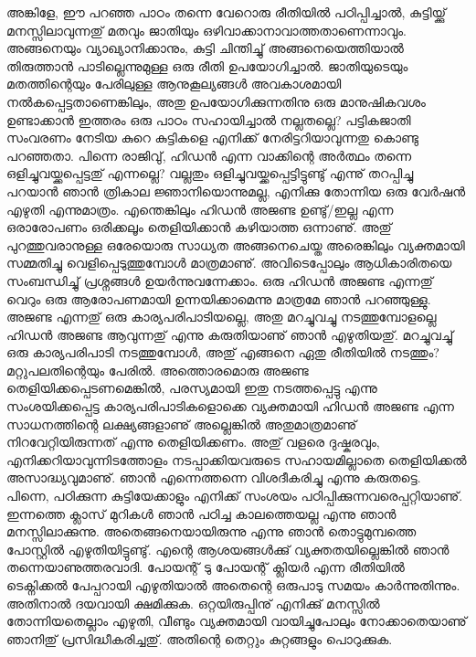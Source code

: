 \begin{enumerate}
അങ്കിളേ, ഈ പറഞ്ഞ പാഠം തന്നെ വേറൊരു രീതിയില്‍ പഠിപ്പിച്ചാല്‍, കുട്ടിയ്ക്കു് മനസ്സിലാവുന്നതു് മതവും ജാതിയും 
ഒഴിവാക്കാനാവാത്തതാണെന്നാവും. അങ്ങനെയും വ്യാഖ്യാനിക്കാനും, കുട്ടി ചിന്തിച്ചു് അങ്ങനെയെത്തിയാല്‍ തിരുത്താന്‍ 
പാടില്ലെന്നുമുള്ള ഒരു രീതി ഉപയോഗിച്ചാല്‍. ജാതിയുടെയും മതത്തിന്റെയും പേരിലുള്ള ആനുകൂല്യങ്ങള്‍ 
അവകാശമായി നല്‍കപ്പെട്ടതാണെങ്കിലും, അതു ഉപയോഗിക്കുന്നതിനു ഒരു മാനുഷികവശം ഉണ്ടാക്കാന്‍ ഇത്തരം 
ഒരു പാഠം സഹായിച്ചാല്‍ നല്ലതല്ലെ? പട്ടികജാതി സംവരണം നേടിയ കുറെ കുട്ടികളെ എനിക്ക് നേരിട്ടറിയാവുന്നതു കൊണ്ടു 
പറഞ്ഞതാ. പിന്നെ രാജിവു്, ഹിഡന്‍ എന്ന വാക്കിന്റെ അര്‍ത്ഥം തന്നെ ഒളിച്ചുവയ്ക്കപ്പെട്ടതു് എന്നല്ലെ? 
വല്ലതും ഒളിച്ചുവയ്ക്കപ്പെട്ടിട്ടുണ്ടു് എന്നു് തറപ്പിച്ചു പറയാന്‍ ഞാന്‍ ത്രികാല ജ്ഞാനിയൊന്നുമല്ല, എനിക്കു തോന്നിയ ഒരു വേര്‍ഷന്‍ 
എഴുതി എന്നുമാത്രം. എന്തെങ്കിലും ഹിഡന്‍ അജണ്ട ഉണ്ടു്/ഇല്ല എന്ന ഒരാരോപണം ഒരിക്കലൂം തെളിയിക്കാന്‍ 
കഴിയാത്ത ഒന്നാണു്. അതു് പുറത്തുവരാനുള്ള ഒരേയൊരു സാധ്യത അങ്ങനെചെയ്ത അരെങ്കിലും വ്യക്തമായി 
സമ്മതിച്ചു വെളിപ്പെടുത്തുമ്പോള്‍ മാത്രമാണു്. അവിടെപ്പോലും ആധികാരിതയെ സംബന്ധിച്ചു് പ്രശ്നങ്ങള്‍ ഉയര്‍ന്നുവന്നേക്കാം. 
ഒരു ഹിഡന്‍ അജണ്ട എന്നതു് വെറും ഒരു ആരോപണമായി ഉന്നയിക്കാമെന്നു മാത്രമേ ഞാന്‍ പറഞ്ഞുള്ളു. അജണ്ട 
എന്നതു് ഒരു കാര്യപരിപാടിയല്ലെ, അതു മറച്ചുവച്ചു നടത്തുമ്പോളല്ലെ ഹിഡന്‍ അജണ്ട ആവുന്നതു് എന്നു കരുതിയാണു് 
ഞാന്‍ എഴുതിയതു്. മറച്ചുവച്ചു് ഒരു കാര്യപരിപാടി നടത്തുമ്പോള്‍, അതു് എങ്ങനെ ഏതു രീതിയില്‍ നടത്തും? 
മറ്റുപലതിന്റെയും പേരില്‍. അത്തൊരമൊരു അജണ്ട തെളിയിക്കപ്പെടണമെങ്കില്‍, പരസ്യമായി ഇതു നടത്തപ്പെട്ടു 
എന്നു സംശയിക്കപ്പെട്ട കാര്യപരിപാടികളൊക്കെ വ്യക്തമായി ഹിഡന്‍ അജണ്ട എന്ന സാധനത്തിന്റെ ലക്ഷ്യങ്ങളാണു് 
അല്ലെങ്കില്‍ അതുമാത്രമാണു് നിറവേറ്റിയിരുന്നത് എന്നു തെളിയിക്കണം. അതു് വളരെ ദുഷ്കരവും, എനിക്കറിയാവുന്നിടത്തോളം 
നടപ്പാക്കിയവരുടെ സഹായമില്ലാതെ തെളിയിക്കല്‍ അസാദ്ധ്യവുമാണു്. ഞാന്‍ എന്നെത്തന്നെ വിശദീകരിച്ചു എന്നു 
കരുതട്ടെ. പിന്നെ, പഠിക്കുന്ന കുട്ടിയേക്കാളും എനിക്ക് സംശയം പഠിപ്പിക്കുന്നവരെപ്പറ്റിയാണു്. ഇന്നത്തെ ക്ലാസ് മുറികള്‍ 
ഞാന്‍ പഠിച്ച കാലത്തെയല്ല എന്നു ഞാന്‍ മനസ്സിലാക്കുന്നു. അതെങ്ങനെയായിരുന്നു എന്നു ഞാന്‍ തൊട്ടുമുമ്പത്തെ 
പോസ്റ്റില്‍ എഴുതിയിട്ടുണ്ടു്. എന്റെ ആശയങ്ങള്‍ക്കു് വ്യക്തതയില്ലെങ്കില്‍ ഞാന്‍ തന്നെയാണുത്തരവാദി. 
പോയന്റ് ടു പോയന്റ് ക്ലിയര്‍ എന്ന രീതിയില്‍ ടെക്നിക്കല്‍ പേപ്പറായി എഴുതിയാല്‍ അതെന്റെ ഒരുപാടു സമയം 
കാര്‍ന്നുതിന്നും. അതിനാല്‍ ദയവായി ക്ഷമിക്കുക. ഒറ്റയിരുപ്പിനു് എനിക്കു് മനസ്സില്‍ തോന്നിയതെല്ലാം എഴുതി, വീണ്ടും 
വ്യക്തമായി വായിച്ചുപോലും നോക്കാതെയാണു് ഞാനിതു് പ്രസിദ്ധീകരിച്ചതു്. അതിന്റെ തെറ്റും കുറ്റങ്ങളും പൊറുക്കുക.

\end{enumerate}

\newpage
